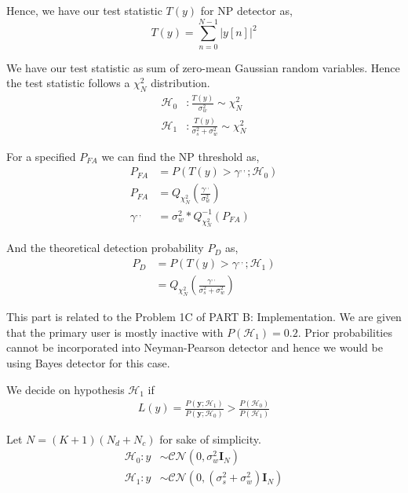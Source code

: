 \documentclass[a4 paper]{article}
\begin{document}
Hence, we have our test statistic $T(y)$ for NP detector as,
\begin{equation*}
	T(y) = 	\sum_{n=0}^{N-1} \vert y[n] \vert ^{2}
\end{equation*}


\newpage
We have our test statistic as sum of zero-mean Gaussian random variables. Hence the test statistic follows a $\chi_{N}^{2}$ distribution. 
\begin{align*}
	\mathcal{H}_{0} &: \frac{T(y)}{\sigma_{w}^{2}}	\sim \chi_{N}^{2}	\\
	\mathcal{H}_{1}	&: \frac{T(y)}{\sigma_{s}^{2} + \sigma_{w}^{2}}	\sim \chi_{N}^{2}
\end{align*}


For a specified $P_{FA}$ we can find the NP threshold as,
\begin{align*}
	P_{FA} &= P(T(y) > \gamma^{,,}; \mathcal{H}_{0})	\\
	P_{FA} &= Q_{\chi_{N}^{2}} \left( \frac{\gamma^{,,}}{\sigma_{w}^{2}}  \right)	\\
	\gamma^{,,} &= \sigma_{w}^{2} * Q_{\chi_{N}^{2}}^{-1} (P_{FA})
\end{align*}

And the theoretical detection probability $P_{D}$ as,
\begin{align*}
	P_{D} &= P(T(y) > \gamma^{,,}; \mathcal{H}_{1})	\\
		&= Q_{\chi_{N}^{2}} \left( \frac{\gamma^{,,}}{\sigma_{s}^{2} + \sigma_{w}^{2}}  \right)
\end{align*}

\solution This part is related to the Problem 1C of PART B: Implementation. We are given that the primary user is mostly inactive with $P(\mathcal{H}_{1}) = 0.2$. Prior probabilities cannot be incorporated into Neyman-Pearson detector and hence we would be using Bayes detector for this case.

We decide on hypothesis $\mathcal{H}_{1}$ if
\begin{align*}
	L(y) = \frac{P(\mathbf{y}; \mathcal{H}_{1})}{P(\mathbf{y}; \mathcal{H}_{0})} > \frac{P(\mathcal{H}_{0})}{P(\mathcal{H}_{1})}
\end{align*}

Let $N = (K + 1)(N_{d} + N_{c})$ for sake of simplicity.
\begin{align*}
	\mathcal{H}_{0}: y &\sim \mathcal{CN}(0, \sigma_{w}^{2}\mathbf{I}_{N})	\\
	\mathcal{H}_{1}: y &\sim \mathcal{CN}(0, (\sigma_{s}^{2} + \sigma_{w}^{2})\mathbf{I}_{N})	
\end{align*}
\end{document}
